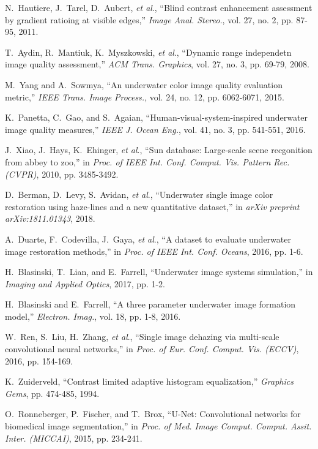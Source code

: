 \documentclass[journal]{IEEEtran}
\newcommand{\etal}{\textit{et al}.}
\begin{document}
\begin{thebibliography}{20}
N.~Hautiere, J.~Tarel, D.~Aubert, \etal, ``Blind contrast enhancement assessment by gradient ratioing at visible edges,'' \emph{Image Anal. Stereo.}, vol. 27, no. 2, pp. 87-95, 2011.

T.~Aydin, R.~Mantiuk, K.~Myszkowski, \etal,  ``Dynamic range independetn image quality assessment,''  \emph{ACM Trans. Graphics}, vol. 27, no. 3, pp. 69-79, 2008.

M.~Yang and  A.~Sowmya, ``An underwater color image quality evaluation metric,'' \emph{IEEE Trans. Image Process.}, vol. 24, no. 12, pp. 6062-6071, 2015.

K.~Panetta, C.~Gao, and S.~Agaian, ``Human-visual-system-inspired underwater image quality measures,'' \emph{IEEE J. Ocean Eng.}, vol. 41, no. 3, pp. 541-551, 2016.

J.~Xiao, J.~Hays, K.~Ehinger, \etal, ``Sun database: Large-scale scene recgonition from abbey to zoo,'' in \emph{Proc. of IEEE Int. Conf. Comput. Vis. Pattern Rec. (CVPR)}, 2010, pp. 3485-3492.


D.~Berman, D.~Levy, S.~Avidan, \etal, ``Underwater single image color restoration using haze-lines and a new quantitative dataset,'' in \emph{arXiv preprint arXiv:1811.01343}, 2018.

A.~Duarte, F.~Codevilla, J.~Gaya, \etal, ``A dataset to evaluate underwater image restoration methods,'' in \emph{Proc. of IEEE Int. Conf. Oceans}, 2016, pp. 1-6.

H.~Blasinski, T.~Lian, and E.~Farrell,  ``Underwater image systems simulation,'' in \emph{Imaging and Applied Optics}, 2017, pp. 1-2.

H.~Blasinski and E.~Farrell, ``A three parameter underwater image formation model,'' \emph{Electron. Imag.}, vol. 18, pp. 1-8, 2016.

W.~Ren, S.~Liu, H.~Zhang, \etal, ``Single image dehazing via multi-scale convolutional neural networks,'' in \emph{Proc. of Eur. Conf. Comput. Vis. (ECCV)}, 2016, pp. 154-169.

K.~Zuiderveld, ``Contrast limited adaptive histogram equalization,'' \emph{Graphics Gems}, pp. 474-485, 1994.


O.~Ronneberger, P.~Fischer, and T.~Brox,  ``U-Net: Convolutional networks for biomedical image segmentation,'' in \emph{Proc. of Med. Image Comput. Comput. Assit. Inter. (MICCAI)}, 2015, pp. 234-241.


\end{thebibliography}
\end{document}
